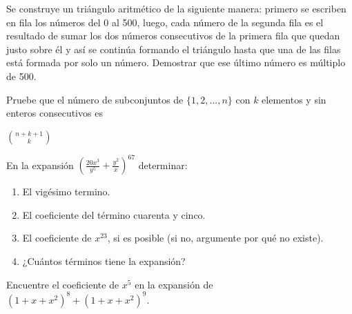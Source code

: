 \documentclass[12pt]{article}
\begin{document}
\begin{ejercicio}
    Se construye un triángulo aritmético de la siguiente manera: primero se escriben en fila los números del 0 al 500, luego, cada número de la segunda fila es el resultado de sumar los dos números consecutivos de la primera fila que quedan justo sobre él y así se continúa formando el triángulo hasta que una de las filas está formada por solo un número. Demostrar que ese último número es múltiplo de 500.
\end{ejercicio}

\begin{ejercicio}
    Pruebe que el número de subconjuntos de $\{1, 2, ..., n\}$ con $k$ elementos y sin enteros consecutivos es

    \begin{center}
        $\binom{n+k+1}{k}$
    \end{center}
\end{ejercicio}

\begin{ejercicio}
    En la expansión $(\frac{20x^3}{y^5} + \frac{y^2}{x})^{67}$ determinar:

    \renewcommand{\labelenumi}{\alph{enumi})}
    \begin{enumerate}
        \item El vigésimo termino.
        \item El coeficiente del término cuarenta y cinco.
        \item El coeficiente de $x^{23}$, si es posible (si no, argumente por qué no existe).
        \item ¿Cuántos términos tiene la expansión?
    \end{enumerate}
\end{ejercicio}

\begin{ejercicio}
    Encuentre el coeficiente de $x^5$ en la expansión de $(1 +x+x^2)^8 + (1 +x+x^2)^9$.
\end{ejercicio}
\end{document}
